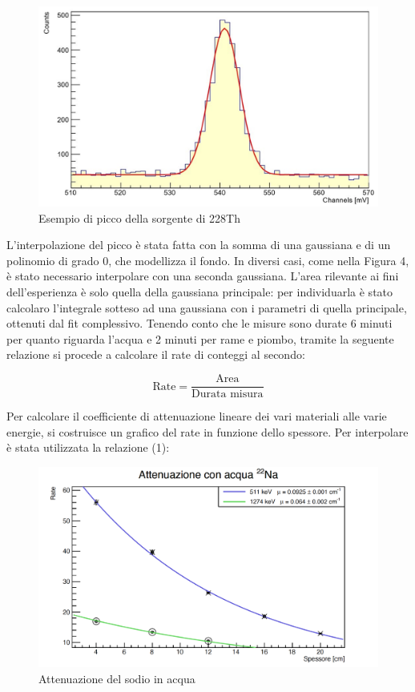 \documentclass[a4paper,10pt]{article}
\begin{document}
\begin{figure}[!h]
    \centering
    \includegraphics[scale=0.6]{grafici/piccotorio}
    \caption{Esempio di picco della sorgente di 228Th}
\end{figure}

\noindent L'interpolazione del picco \`e stata fatta con la somma di una gaussiana e di un polinomio di grado 0, che modellizza il fondo. In diversi casi, come nella Figura 4, \`e stato necessario interpolare con una seconda gaussiana. L'area rilevante ai fini dell'esperienza \`e solo quella della gaussiana principale: per individuarla \`e stato calcolaro l'integrale sotteso ad una gaussiana con i parametri di quella principale, ottenuti dal fit complessivo. Tenendo conto che le misure sono durate 6 minuti per quanto riguarda l'acqua e 2 minuti per rame e piombo, tramite la seguente relazione si procede a calcolare il rate di conteggi al secondo:

\begin{equation}
	\textrm{Rate} = \frac{\textrm{Area}}{\textrm{Durata  misura}}
\end{equation}

\noindent Per calcolare il coefficiente di attenuazione lineare dei vari materiali alle varie energie, si costruisce un grafico del rate in funzione dello spessore. Per interpolare è stata utilizzata la relazione (1):

\begin{figure}[H]
    \centering
    \includegraphics[scale=0.6]{grafici/attenuazionesodioacqua}
    \caption{Attenuazione del sodio in acqua}
\end{figure}
\end{document}
